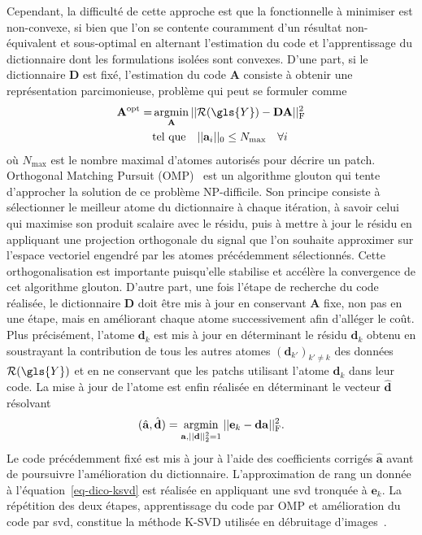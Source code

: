 %
Cependant, la difficulté de cette approche est que la fonctionnelle à minimiser est non-convexe, si bien que l'on se contente couramment d'un résultat non-équivalent et sous-optimal en alternant l'estimation du code et l'apprentissage du dictionnaire dont les formulations isolées sont convexes.
%
D'une part, si le dictionnaire $\mathbf{D}$ est fixé, l'estimation du code $\mathbf{A}$ consiste à obtenir une représentation parcimonieuse, problème qui peut se formuler comme
\begin{align}
    \mathbf{A}^{\mathrm{opt}} = &\argmin_{\mathbf{A}} \frobnorm{ \mathcal{R}(\gls{Y}) - \mathbf{DA}}\\
    &\text{tel que}
    \quad
    ||\mathbf{a}_i||_0 \leq N_{\mathrm{max}}\quad\forall i
\end{align}
où $N_{\mathrm{max}}$ est le nombre maximal d'atomes autorisés pour décrire un patch. Orthogonal Matching Pursuit (OMP)~\cite{mallat1993matching, pati1993orthogonal} est un algorithme glouton qui tente d'approcher la solution de ce problème NP-difficile. Son principe consiste à sélectionner le meilleur atome du dictionnaire à chaque itération, à savoir celui qui maximise son produit scalaire avec le résidu, puis à mettre à jour le résidu en appliquant une projection orthogonale du signal que l'on souhaite approximer sur l'espace vectoriel engendré par les atomes précédemment sélectionnés. Cette orthogonalisation est importante puisqu'elle stabilise et accélère la convergence de cet algorithme glouton.
%
D'autre part, une fois l'étape de recherche du code réalisée, le dictionnaire $\mathbf{D}$ doit être mis à jour en conservant $\mathbf{A}$ fixe, non pas en une étape, mais en améliorant chaque atome successivement afin d'alléger le coût. Plus précisément, l'atome $\mathbf{d}_k$ est mis à jour en déterminant le résidu $\mathbf{d}_k$ obtenu en soustrayant la contribution de tous les autres atomes $(\mathbf{d}_{k'})_{k'\neq k}$  des données $\mathcal{R}(\gls{Y})$ et en ne conservant que les patchs utilisant l'atome $\mathbf{d}_k$ dans leur code. La mise à jour de l'atome est enfin réalisée en déterminant le vecteur $\hat{\mathbf{d}}$ résolvant
\begin{equation}\label{eq-dico-ksvd}
    (\hat{\mathbf{a}}, \hat{\mathbf{d}}) = \argmin_{\mathbf{a}, \twonorm{\mathbf{d}}=1} \frobnorm{\mathbf{e}_k-\mathbf{da}}.
\end{equation}
Le code précédemment fixé est mis à jour à l'aide des coefficients corrigés $\hat{\mathbf{a}}$ avant de poursuivre l'amélioration du dictionnaire. L'approximation de rang un donnée à l'équation~\eqref{eq-dico-ksvd} est réalisée en appliquant une \gls{svd} tronquée à $\mathbf{e}_k$. La répétition des deux étapes, apprentissage du code par OMP et amélioration du code par \gls{svd}, constitue la méthode K-SVD utilisée en débruitage d'images~\cite{elad2006image}.

